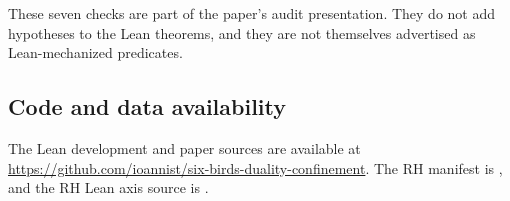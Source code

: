 \documentclass[11pt]{article}
\theoremstyle{definition}
\begin{document}
These seven checks are part of the paper's audit presentation.  They
do not add hypotheses to the Lean theorems, and they are not
themselves advertised as Lean-mechanized predicates.

\subsection*{Code and data availability}

The Lean development and paper sources are available at
\url{https://github.com/ioannist/six-birds-duality-confinement}.  The
RH manifest is , and the RH Lean
axis source is .
 
\clearpage


\end{document}
